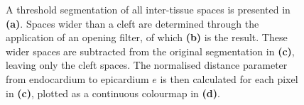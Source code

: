     \begin{figure}[htbp]
      \centering
      \caption{A threshold segmentation of all inter-tissue spaces is presented in \textbf{(a)}. Spaces wider than a cleft are determined through the application of an opening filter, of which \textbf{(b)} is the result. These wider spaces are subtracted from the original segmentation in \textbf{(c)}, leaving only the cleft spaces. The normalised distance parameter from endocardium to epicardium $e$ is then calculated for each pixel in \textbf{(c)}, plotted as a continuous colourmap in \textbf{(d)}.}
      \label{fig:2D_cleft_extraction}
    \end{figure}
  

